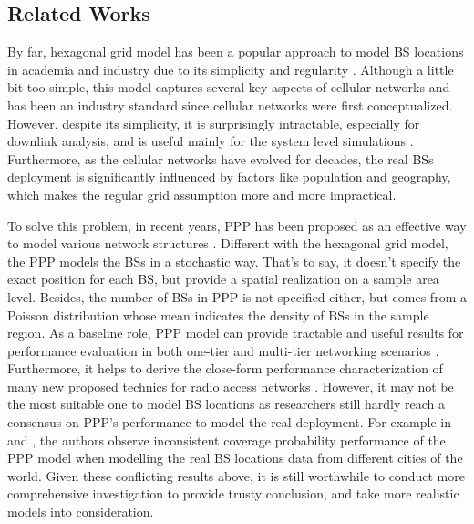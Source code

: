 
\subsection{Related Works}
By far, hexagonal grid model has been a popular approach to model BS locations in academia and industry due to its simplicity and regularity \cite{rappaport1996wireless}. Although a little bit too simple, this model captures several key aspects of cellular networks and has been an industry standard since cellular networks were first conceptualized. However, despite its simplicity, it is surprisingly intractable, especially for downlink analysis, and is useful mainly for the system level simulations \cite{chenand2011system}. Furthermore, as the cellular networks have evolved for decades, the real BSs deployment is significantly influenced by factors like population and geography, which makes the regular grid assumption more and more impractical.

To solve this problem, in recent years, PPP has been proposed as an effective way to model various network structures \cite{haenggi2009stochastic,andrews2010primer,andrews2011tractable,dhillon2012modeling}. Different with the hexagonal grid model, the PPP models the BSs in a stochastic way. That's to say, it doesn't specify the exact position for each BS, but provide a spatial realization on a sample area level. Besides, the number of BSs in PPP is not specified either, but comes from a Poisson distribution whose mean indicates the density of BSs in the sample region. As a baseline role, PPP model can provide tractable and useful results for performance evaluation in both one-tier and multi-tier networking scenarios \cite{cheung2012throughput,chandrasekhar2009spectrum}. Furthermore, it helps to derive the close-form performance characterization of many new proposed technics for radio access networks \cite{yang2016analysis,huang2014enabling}. However, it may not be the most suitable one to model BS locations as researchers still hardly reach a consensus on PPP's performance to model the real deployment. For example in \cite{andrews2011tractable} and \cite{lee2013stochastic}, the authors observe inconsistent coverage probability performance of the PPP model when modelling the real BS locations data from different cities of the world. Given these conflicting results above, it is still worthwhile to conduct more comprehensive investigation to provide trusty conclusion, and take more realistic models into consideration.

